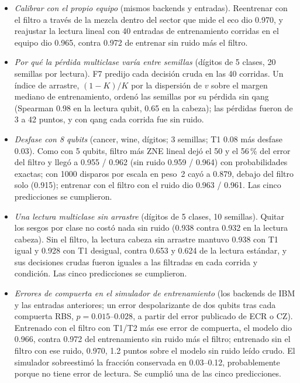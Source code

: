 \documentclass[11pt]{article}
\begin{document}
\begin{itemize}
  filtro con esa calibración dio 0.968, y sin el filtro 0.968. Los errores de compuerta, que una calibración de T1/T2
  no describe, dominan estos modelos de ruido; el eco bajó el error del valor de decisión pero no cambió decisiones.
\item \textit{Calibrar con el propio equipo} (mismos backends y entradas). Reentrenar con el filtro a través de la mezcla
  dentro del sector que mide el eco dio 0.970, y reajustar la lectura lineal con 40 entradas de entrenamiento corridas en
  el equipo dio 0.965, contra 0.972 de entrenar sin ruido más el filtro.
\item \textit{Por qué la pérdida multiclase varía entre semillas} (dígitos de 5 clases, 20 semillas por lectura). F7
  predijo cada decisión cruda en las 40 corridas. Un índice de arrastre, $(1-K)/K$ por la dispersión de $v$ sobre el
  margen mediano de entrenamiento, ordenó las semillas por su pérdida sin qang (Spearman 0.98 en la lectura qubit, 0.65
  en la cabeza); las pérdidas fueron de 3 a 42 puntos, y con qang cada corrida fue sin ruido.
\item \textit{Desfase con 8 qubits} (cancer, wine, dígitos; 3 semillas; T1 0.08 más desfase 0.03). Como con 5 qubits,
  filtro más ZNE lineal dejó el 50 y el 56\,\% del error del filtro y llegó a 0.955 / 0.962 (sin ruido 0.959 / 0.964)
  con probabilidades exactas; con 1000 disparos por escala en peso~2 cayó a 0.879, debajo del filtro solo (0.915);
  entrenar con el filtro con el ruido dio 0.963 / 0.961. Las cinco predicciones se cumplieron.
\item \textit{Una lectura multiclase sin arrastre} (dígitos de 5 clases, 10 semillas). Quitar los sesgos por clase no
  costó nada sin ruido (0.938 contra 0.932 en la lectura cabeza). Sin el filtro, la lectura cabeza sin arrastre mantuvo
  0.938 con T1 igual y 0.928 con T1 desigual, contra 0.653 y 0.624 de la lectura estándar, y sus decisiones crudas
  fueron iguales a las filtradas en cada corrida y condición. Las cinco predicciones se cumplieron.
\item \textit{Errores de compuerta en el simulador de entrenamiento} (los backends de IBM y las entradas anteriores; un
  error despolarizante de dos qubits tras cada compuerta RBS, $p=0.015$--$0.028$, a partir del error publicado de ECR o
  CZ). Entrenado con el filtro con T1/T2 más ese error de compuerta, el modelo dio 0.966, contra 0.972 del
  entrenamiento sin ruido más el filtro; entrenado sin el filtro con ese ruido, 0.970, 1.2 puntos sobre el modelo sin
  ruido leído crudo. El simulador sobreestimó la fracción conservada en 0.03--0.12, probablemente porque no tiene error
  de lectura. Se cumplió una de las cinco predicciones.
\end{itemize}
\end{document}
